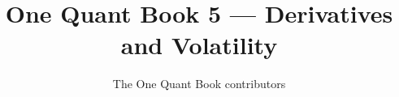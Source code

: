 \documentclass[11pt,a4paper,twoside,openany]{book}
\title{One Quant Book 5 --- Derivatives and Volatility}
\author{The One Quant Book contributors}
\date{\bookdate}
\begin{document}
\frontmatter



\tableofcontents

\mainmatter


\appendix
\part{\omsolutionspart}


\backmatter
\printindex
\end{document}
